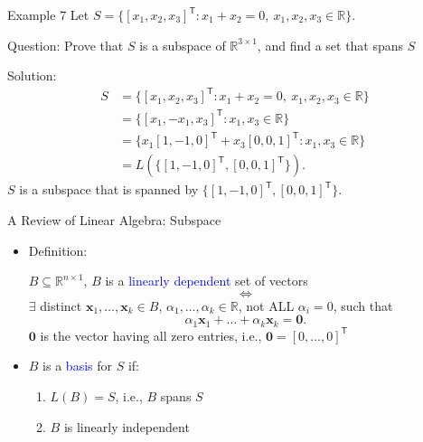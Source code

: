 \documentclass[aspectratio=169,hyperref,UTF8,CJK]{beamer}
\newcommand{\R}{\mathbb{R}}
\newcommand{\trans}{\mathsf{T}}
\newcommand{\vect}[1]{\boldsymbol{#1}}
\begin{document}
\begin{frame}{Example 7}
  \footnotesize
  Let $S=\{[x_1,x_2,x_3]^{\trans}:x_1+x_2=0,\ x_1,x_2,x_3\in\R\}$.

  \medskip
  Question: Prove that $S$ is a subspace of $\R^{3\times1}$, and find a set that spans $S$

  \medskip
  Solution:
  \begin{align*}
    S&=\{[x_1,x_2,x_3]^{\trans}:x_1+x_2=0,\ x_1,x_2,x_3\in\R\}\\
     &=\{[x_1,-x_1,x_3]^{\trans}:x_1,x_3\in\R\}\\
     &=\{x_1[1,-1,0]^{\trans}+x_3[0,0,1]^{\trans}:x_1,x_3\in\R\}\\
     &=L(\{[1,-1,0]^{\trans},[0,0,1]^{\trans}\}).
  \end{align*}
  $S$ is a subspace that is spanned by $\{[1,-1,0]^{\trans},[0,0,1]^{\trans}\}$.
\end{frame}

\begin{frame}{A Review of Linear Algebra: Subspace}
  \small
  \begin{itemize}
    \item Definition:

      $B\subseteq\R^{n\times1}$, $B$ is a \textcolor{blue}{linearly dependent} set of vectors
      \begin{equation*}
        \Longleftrightarrow
      \end{equation*}
      $\exists$ distinct $\vect{x}_1,\ldots,\vect{x}_k\in B$, $\alpha_1,\ldots,\alpha_k\in\R$, not ALL $\alpha_i=0$, such that
      \begin{equation*}
        \alpha_1\vect{x}_1+\ldots+\alpha_k\vect{x}_k=\vect{0}.
      \end{equation*}
      $\vect{0}$ is the vector having all zero entries, i.e., $\vect{0}=[0,\ldots,0]^{\trans}$
    \item $B$ is a \textcolor{blue}{basis} for $S$ if:
      \begin{enumerate}
        \item $L(B)=S$, i.e., $B$ spans $S$
        \item $B$ is linearly independent
      \end{enumerate}
  \end{itemize}
\end{frame}
\end{document}

